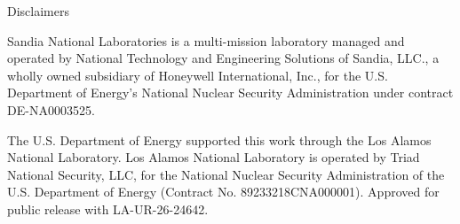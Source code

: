 \begin{frame}{Disclaimers}

\begin{block}{}\small
Sandia National Laboratories is a multi-mission laboratory managed and operated by National Technology and Engineering Solutions of Sandia, LLC., a wholly owned subsidiary of Honeywell International, Inc., for the U.S. Department of Energy’s National Nuclear Security Administration under contract DE-NA0003525.\newline
\sandid
\end{block}

\begin{block}{}
The U.S. Department of Energy supported this work through the Los Alamos National Laboratory. Los Alamos National Laboratory is operated by Triad National Security, LLC, for the National Nuclear Security Administration of the U.S. Department of Energy (Contract No. 89233218CNA000001). Approved for public release with LA-UR-26-24642. 
\end{block}

\end{frame}



